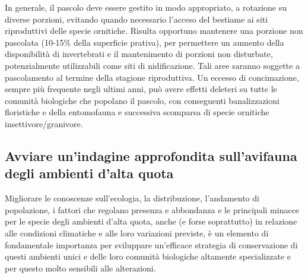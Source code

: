 \documentclass[10pt,twoside,openany,x11names,svgnames,italian,a5paper,dvipsnames,table]{memoir}
\begin{document}
In generale, il pascolo deve essere gestito in modo appropriato, a rotazione su diverse porzioni, evitando quando necessario l'acceso del bestiame ai siti riproduttivi delle specie ornitiche. Risulta opportuno mantenere una porzione non pascolata (10-15\% della superficie prativa), per permettere un aumento della disponibilità di invertebrati e il mantenimento di porzioni non disturbate, potenzialmente utilizzabili come siti di nidificazione. Tali aree saranno soggette a pascolamento al termine della stagione riproduttiva.
Un eccesso di concimazione, sempre più frequente negli ultimi anni, può avere effetti deleteri su tutte le comunità biologiche che popolano il pascolo, con conseguenti banalizzazioni floristiche e della entomofauna e successiva scomparsa di specie ornitiche insettivore/granivore.

\subsection{Avviare un'indagine approfondita sull’avifauna degli ambienti d'alta quota}
Migliorare le conoscenze sull'ecologia, la distribuzione, l'andamento di popolazione, i fattori che regolano presenza e abbondanza e le principali minacce per le specie degli ambienti d'alta quota, anche (e forse soprattutto) in relazione alle condizioni climatiche e alle loro variazioni previste, è un elemento di fondamentale importanza per sviluppare un'efficace strategia di conservazione di questi ambienti unici e delle loro comunità biologiche altamente specializzate e per questo molto sensibili alle alterazioni.
\end{document}
